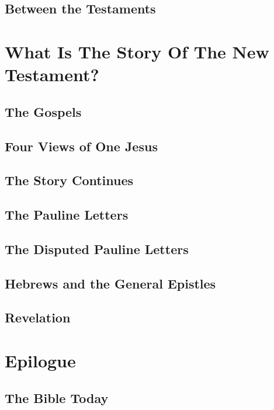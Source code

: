 \documentclass{report}
\begin{document}
    \chapter{Between the Testaments}

\part{What Is The Story Of The New Testament?}

    \chapter{The Gospels}
    \chapter{Four Views of One Jesus}
    \chapter{The Story Continues}
    \chapter{The Pauline Letters}
    \chapter{The Disputed Pauline Letters}
    \chapter{Hebrews and the General Epistles}
    \chapter{Revelation}

\part{Epilogue}

    \chapter{The Bible Today}
\end{document}
